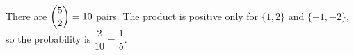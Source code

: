 There are $\dbinom52=10$ pairs. The product is positive only for $\{1,2\}$ and $\{-1,-2\}$, so the probability is $\dfrac2{10}=\boxed{\dfrac15}$.

